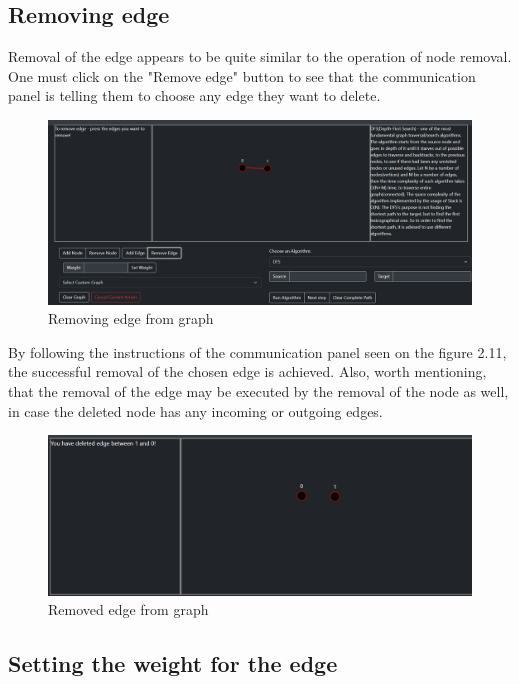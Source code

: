\subsection{Removing edge}

Removal of the edge appears to be quite similar to the operation of node removal. One must click on the "Remove edge" button to see that the communication panel is telling them to choose any edge they want to delete.

\begin{figure}[H]
	\centering
	\includegraphics[width=\textwidth]{images/removing_edge.png}
	\caption{Removing edge from graph}
\end{figure}

By following the instructions of the communication panel seen on the figure 2.11, the successful removal of the chosen edge is achieved. Also, worth mentioning, that the removal of the edge may be executed by the removal of the node as well, in case the deleted node has any incoming or outgoing edges.

\begin{figure}[H]
	\centering
	\includegraphics[width=\textwidth]{images/removed_edge.png}
	\caption{Removed edge from graph}
\end{figure}

\subsection{Setting the weight for the edge}

